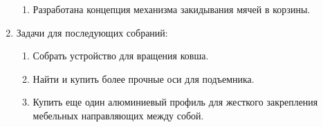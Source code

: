 \begin{enumerate}
\begin{enumerate}
      \item  Разработана концепция механизма закидывания мячей в корзины.
    \end{enumerate}
    
	\item Задачи для последующих собраний:
	\begin{enumerate}
	  \item Собрать устройство для вращения ковша.
	  
	  \item Найти и купить более прочные оси для подъемника.
	  
	  \item Купить еще один алюминиевый профиль для жесткого закрепления мебельных направляющих между собой.

    \end{enumerate}     
\end{enumerate}
\fillpage
